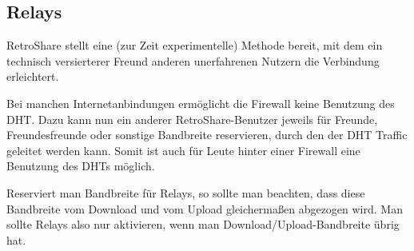 \subsection{Relays}
RetroShare stellt eine (zur Zeit experimentelle) Methode bereit, mit dem ein technisch versierterer Freund anderen unerfahrenen Nutzern die Verbindung erleichtert.

Bei manchen Internetanbindungen ermöglicht die Firewall keine Benutzung des DHT. Dazu kann nun ein anderer RetroShare-Benutzer jeweils für Freunde, Freundesfreunde oder sonstige Bandbreite reservieren, durch den der DHT Traffic geleitet werden kann. Somit ist auch für Leute hinter einer Firewall eine Benutzung des DHTs möglich.

Reserviert man Bandbreite für Relays, so sollte man beachten, dass diese Bandbreite vom Download und vom Upload gleichermaßen abgezogen wird. Man sollte Relays also nur aktivieren, wenn man Download/Upload-Bandbreite übrig hat.

